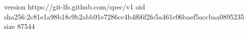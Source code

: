 version https://git-lfs.github.com/spec/v1
oid sha256:2c81e1a98b18c9b2abb91e7286cc4b4f66f2fe5a461c06baef5accbaa0895235
size 87544
